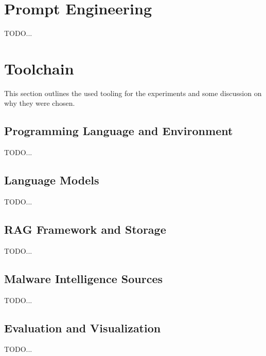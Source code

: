 \section{Prompt Engineering}
TODO...

\section{Toolchain}
This section outlines the used tooling for the experiments and some discussion
on why they were chosen.

\subsection{Programming Language and Environment}
TODO...

\subsection{Language Models}
TODO...

\subsection{RAG Framework and Storage}
TODO...

\subsection{Malware Intelligence Sources}
TODO...

\subsection{Evaluation and Visualization}
TODO...

